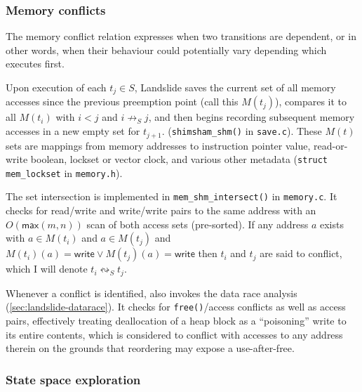 \subsubsection{Memory conflicts}
\label{sec:landslide-dpor-conflix}

The memory conflict relation expresses when two transitions are dependent,
or in other words, when their behaviour could potentially vary depending which executes first.

Upon execution of each $t_j \in S$,
Landslide saves the current set of all memory accesses since the previous preemption point (call this $M(t_j)$),
compares it to all $M(t_i)$ with $i < j$ and $i \not\rightarrow_S j$,
and then begins recording subsequent memory accesses in a new empty set for $t_{j+1}$.
({\tt shimsham\_shm()} in {\tt save.c}).
These $M(t)$ sets are mappings from memory addresses to
instruction pointer value, read-or-write boolean, lockset or vector clock, and various other metadata
({\tt struct mem\_lockset} in {\tt memory.h}).

The set intersection is implemented in {\tt mem\_shm\_intersect()} in {\tt memory.c}.
It checks for read/write and write/write pairs to the same address with an $O(\mathsf{max}(m,n))$ scan of both access sets (pre-sorted).
If any address $a$ exists with $a \in M(t_i)$ and $a \in M(t_j)$ and $M(t_i)(a) = \mathsf{write} \vee M(t_j)(a) = \mathsf{write}$
then $t_i$ and $t_j$ are said to conflict,
which I will denote $t_i \leftrightsquigarrow_S t_j$.

Whenever a conflict is identified,
 also invokes the data race analysis (\cref{sec:landslide-datarace}).
It checks for {\tt free()}/access conflicts as well as access pairs,
effectively treating deallocation of a heap block as a ``poisoning'' write to its entire contents,
which is considered to conflict with accesses to any address therein
on the grounds that reordering may expose a use-after-free.

\subsubsection{State space exploration}
\label{sec:landslide-explore}

